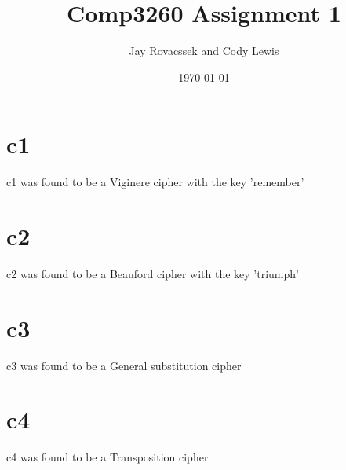 \documentclass{article}
\title{Comp3260 Assignment 1}
\author{Jay Rovacssek and Cody Lewis}
\date{\today}
\begin{document}
  \maketitle

  \section{c1}
    c1 was found to be a Viginere cipher with the key 'remember'
  \section{c2}
    c2 was found to be a Beauford cipher with the key 'triumph'
  \section{c3}
    c3 was found to be a General substitution cipher
  \section{c4}
    c4 was found to be a Transposition cipher
\end{document}
